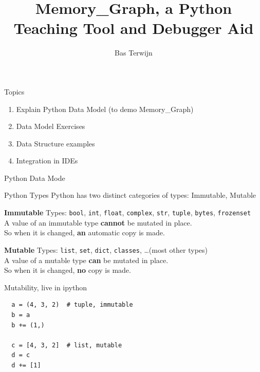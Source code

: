 \documentclass[10pt, colorlinks=true, urlcolor=blue]{beamer}
\title{Memory\_Graph, a Python Teaching Tool and Debugger Aid}
\author{Bas Terwijn}
\date{}
\begin{document}
\begin{frame}
    \titlepage
\end{frame}

\begin{frame}{Topics}
  \begin{enumerate}
    \item Explain Python Data Model (to demo Memory\_Graph)
    \item Data Model Exercises
    \item Data Structure examples
    \item Integration in IDEs
  \end{enumerate}
\end{frame}

\begin{frame}{Python Data Mode}
  \begin{block}{Python Types}
    Python has two distinct categories of types: Immutable, Mutable
  \end{block}
  
  \vspace{2.4em}
  
  \textbf{Immutable} Types: \texttt{bool}, \texttt{int}, \texttt{float}, \texttt{complex}, \texttt{str}, \texttt{tuple}, \texttt{bytes}, \texttt{frozenset} \\
  
  \vspace{-0.8em}
  A value of an immutable type \textbf{cannot} be mutated in place. \\
  So when it is changed, \textbf{an} automatic copy is made. \\
  
  \vspace{2.0em}
  
  \textbf{Mutable} Types: \texttt{list}, \texttt{set}, \texttt{dict}, \texttt{classes}, \dots (most other types) \\
  
  \vspace{-0.8em}
  A value of a mutable type \textbf{can} be mutated in place. \\
  So when it is changed, \textbf{no} copy is made.
\end{frame}


\begin{frame}[fragile]{Mutability, live in ipython}
  \begin{verbatim}
  a = (4, 3, 2)  # tuple, immutable
  b = a
  b += (1,)

  c = [4, 3, 2]  # list, mutable
  d = c
  d += [1]
  \end{verbatim}
\end{frame}
\end{document}
